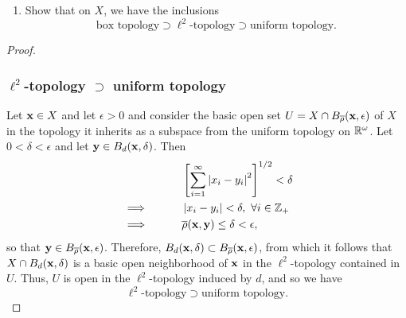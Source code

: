 \begin{solution}
  \begin{enumerate}[label={(\alph*)}, align=left, leftmargin=\parindent, listparindent=\parindent, labelwidth=0pt, itemindent=!]
    \item
      Show that on $X$, we have the inclusions
      \begin{equation*}
        \text{box topology} \supset \ell^2\text{-topology} \supset \text{uniform topology}.
      \end{equation*}
  \end{enumerate}
  \begin{proof}~

    \subsubsection*{$\ell^2$-topology $\supset$ uniform topology}
    Let $\mathbf{x} \in X$ and let $\epsilon > 0$ and consider the basic open set $U = X \cap B_{\overline{\rho}}(\mathbf{x}, \epsilon)$ of $X$ in the topology it inherits as a subspace from the uniform topology on $\mathbb{R}^\omega$.
    Let $0 < \delta < \epsilon$ and let $\mathbf{y} \in B_d(\mathbf{x}, \delta)$.
    Then
    \begin{alignat*}{2}
      &           && \qquad \left[ \sum_{i=1}^\infty \left| x_i - y_i \right|^2 \right]^{1/2} < \delta \\
      & \implies  && \qquad \left| x_i - y_i \right| < \delta,~ \forall i \in \mathbb{Z}_+ \\
      & \implies  && \qquad \overline{\rho}(\mathbf{x}, \mathbf{y}) \leq \delta < \epsilon,
    \end{alignat*}
    so that $\mathbf{y} \in B_{\overline{\rho}}(\mathbf{x}, \epsilon)$.
    Therefore, $B_d(\mathbf{x}, \delta) \subset B_{\overline{\rho}}(\mathbf{x}, \epsilon)$, from which it follows that $X \cap B_d(\mathbf{x}, \delta)$ is a basic open neighborhood of $\mathbf{x}$ in the $\ell^2$-topology contained in $U$.
    Thus, $U$ is open in the $\ell^2$-topology induced by $d$, and so we have
    \begin{equation*}
      \ell^2\text{-topology} \supset \text{uniform topology}.
    \end{equation*}


\end{proof}
\end{solution}
